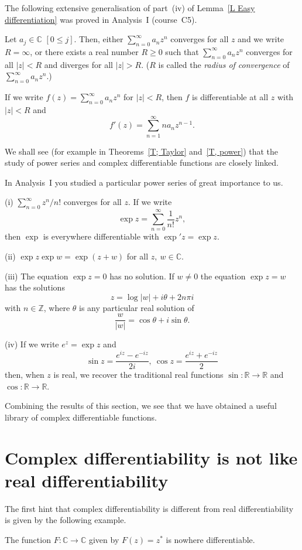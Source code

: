 The following extensive generalisation of 
part~(iv) of Lemma~\ref{L Easy differentiation}
was proved
in Analysis~I (course~C5).
\begin{theorem}\label{T, power series analytic}
Let $a_{j}\in{\mathbb C}$ $[0\leq j]$. Then,
either $\sum_{n=0}^{\infty}a_{n}z^{n}$ converges for all
$z$ and we write $R=\infty$, or there exists a real number 
$R\geq 0$ such that $\sum_{n=0}^{\infty}a_{n}z^{n}$
converges for all $|z|<R$ and diverges for all $|z|>R$.
($R$ is called the \emph{radius of convergence}
of $\sum_{n=0}^{\infty}a_{n}z^{n}$.)

If we write $f(z)=\sum_{n=0}^{\infty}a_{n}z^{n}$
for $|z|<R$, then $f$ is differentiable at all $z$
with $|z|<R$ and
\[f'(z)=\sum_{n=1}^{\infty}na_{n}z^{n-1}.\]
\end{theorem}
We shall see (for example in Theorems~\ref{T; Taylor}
and~\ref{T, power})
that the study of power series and complex differentiable
functions are closely linked.

In  Analysis~I you studied a particular power series of
great importance to us.
\begin{theorem}\label{T Exponential} 
(i) $\sum_{n=0}^{\infty}z^{n}/n!$ converges for all
$z$. If we write
\[\exp z=\sum_{n=0}^{\infty}\frac{1}{n!}z^{n},\]
then $\exp$ is everywhere differentiable with
$\exp' z=\exp z$.

(ii) $\exp z\exp w=\exp(z+w)$ for all $z,\ w\in{\mathbb C}$.

(iii) The equation $\exp z=0$ has no solution. If $w\neq 0$
the equation $\exp z=w$ has the solutions 
\[z=\log |w|+i\theta+2n\pi i\]
with $n\in{\mathbb Z}$, where $\theta$ is any particular
real solution of
\[\frac{w}{|w|}=\cos\theta+i\sin\theta.\]

(iv) If we write $e^{z}=\exp z$ and
\[\sin z=\frac{e^{iz}-e^{-iz}}{2i},
\ \cos z=\frac{e^{iz}+e^{-iz}}{2}\]
then, when $z$ is real, we recover the traditional
real functions $\sin:{\mathbb R}\rightarrow{\mathbb R}$
and $\cos:{\mathbb R}\rightarrow{\mathbb R}$.
\end{theorem}
Combining the results of this section, we see that we have
obtained a useful library of complex differentiable functions.
\section{Complex differentiability is not like real differentiability}
The first hint that complex differentiability is different
from real differentiability is given by the following
example.
\begin{example}\label{Example, conjugate} 
The function $F:{\mathbb C}\rightarrow{\mathbb C}$
given by $F(z)=z^{*}$ is nowhere differentiable.
\end{example}

